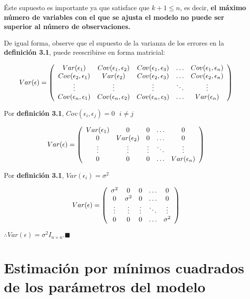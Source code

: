 \documentclass[
  a4paper,
  oneside,
  openany]{book}
\begin{document}
Éste supuesto es importante ya que satisface que \(k+1\leq n\), es decir, \textbf{el máximo número de variables con el que se ajusta el modelo no puede ser superior al número de observaciones.}

De igual forma, observe que el supuesto de la varianza de los errores en la \textbf{definición 3.1}, puede reescribirse en forma matricial:

\[
Var(\epsilon)=
\left(
\begin{array}{c c c c c}
Var(\epsilon_{1}) & Cov(\epsilon_{1},\epsilon_{2}) & Cov(\epsilon_{1},\epsilon_{3}) & \ldots & Cov(\epsilon_{1},\epsilon_{ n})\\ 
Cov(\epsilon_{2},\epsilon_{1})&Var(\epsilon_{2}) & Cov(\epsilon_{2},\epsilon_{3}) & \ldots &Cov(\epsilon_{2},\epsilon_{n}) \\
\vdots & \vdots & \vdots & \ddots & \vdots\\
Cov(\epsilon_{n},\epsilon_{1})   & Cov(\epsilon_{n},\epsilon_{2}) & Cov(\epsilon_{n},\epsilon_{3}) & \ldots & Var(\epsilon_{n})\\
\end{array}
\right)
\]

Por \textbf{definición 3.1}, \(Cov(\epsilon_{i},\epsilon_{j})=0 \ \ \ i\neq j\)

\[
Var(\epsilon)=
\left(
\begin{array}{c c c c c}
Var(\epsilon_{1}) & 0 & 0 & \ldots & 0 \\ 
0&Var(\epsilon_{2}) & 0 & \ldots & 0 \\
\vdots & \vdots & \vdots & \ddots & \vdots\\
0 & 0 & 0 & \ldots & Var(\epsilon_{n})\\
\end{array}
\right)
\]

Por \textbf{definición 3.1}, \(Var(\epsilon_{i})=\sigma^2\)

\[
Var(\epsilon)=
\left(
\begin{array}{c c c c c}
\sigma^2 & 0 & 0 & \ldots & 0 \\ 
0&\sigma^2 & 0 & \ldots & 0 \\
\vdots & \vdots & \vdots & \ddots & \vdots\\
0 & 0 & 0 & \ldots &\sigma^2  \\
\end{array}
\right)
\]

\(\therefore Var(\epsilon)=\sigma^2 I_{n \times n}. \blacksquare\)

\hypertarget{estimaciuxf3n-por-muxednimos-cuadrados-de-los-paruxe1metros-del-modelo-2}{%
\section{Estimación por mínimos cuadrados de los parámetros del modelo}\label{estimaciuxf3n-por-muxednimos-cuadrados-de-los-paruxe1metros-del-modelo-2}}
\end{document}
